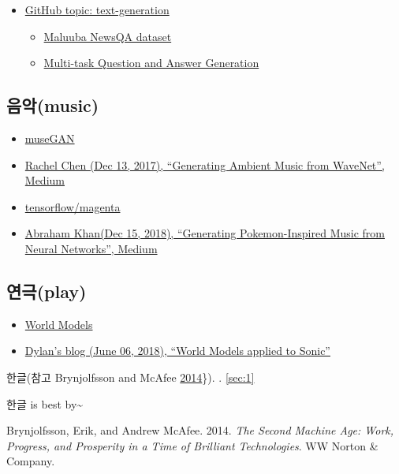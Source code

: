 \documentclass[smallextended]{svjour3}       %
\providecommand{\tightlist}{%
  \setlength{\itemsep}{0pt}\setlength{\parskip}{0pt}}
\newlength{\cslhangindent}
\newenvironment{cslreferences}%
  {\setlength{\parindent}{0pt}%
  \everypar{\setlength{\hangindent}{\cslhangindent}}\ignorespaces}%
  {\par}
\begin{document}
\begin{itemize}
\tightlist
\item
  \href{https://github.com/topics/text-generation}{GitHub topic:
  text-generation}

  \begin{itemize}
  \tightlist
  \item
    \href{https://github.com/Maluuba/newsqa}{Maluuba NewsQA dataset}
  \item
    \href{https://github.com/Maluuba/qgen-workshop}{Multi-task Question
    and Answer Generation}
  \end{itemize}
\end{itemize}

\hypertarget{music-machine}{%
\subsection{음악(music)}\label{music-machine}}

\begin{itemize}
\tightlist
\item
  \href{https://salu133445.github.io/musegan/}{museGAN}
\item
  \href{https://medium.com/@rachelchen_49210/generating-ambient-noise-from-wavenet-95aa7f0a8f77}{Rachel
  Chen (Dec 13, 2017), ``Generating Ambient Music from WaveNet'',
  Medium}
\item
  \href{https://github.com/tensorflow/magenta}{tensorflow/magenta}
\item
  \href{https://towardsdatascience.com/generating-pokemon-inspired-music-from-neural-networks-bc240014132}{Abraham
  Khan(Dec 15, 2018), ``Generating Pokemon-Inspired Music from Neural
  Networks'', Medium}
\end{itemize}

\hypertarget{play-machine}{%
\subsection{연극(play)}\label{play-machine}}

\begin{itemize}
\tightlist
\item
  \href{https://worldmodels.github.io/}{World Models}
\item
  \href{https://dylandjian.github.io/world-models/}{Dylan's blog (June
  06, 2018), ``World Models applied to Sonic''}
\end{itemize}

한글(참고 Brynjolfsson and McAfee
\protect\hyperlink{ref-brynjolfsson2014second}{2014}\}).
\cite{Galyardt14mmm}. \ref{sec:1}

한글 is best by\textasciitilde{}\cite{brynjolfsson2014second}

\hypertarget{refs}{}
\begin{cslreferences}
\leavevmode\hypertarget{ref-brynjolfsson2014second}{}%
Brynjolfsson, Erik, and Andrew McAfee. 2014. \emph{The Second Machine
Age: Work, Progress, and Prosperity in a Time of Brilliant
Technologies}. WW Norton \& Company.
\end{cslreferences}



\end{document}
